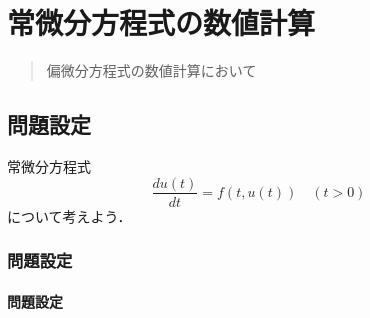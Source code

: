 \chapter{常微分方程式の数値計算}
\begin{abstract}
偏微分方程式の数値計算において
\end{abstract}

\section{問題設定}
常微分方程式
$$
\frac{du(t)}{dt}=f(t,u(t))\quad(t>0)
$$
について考えよう．

\subsection{問題設定}
\subsubsection{問題設定}
